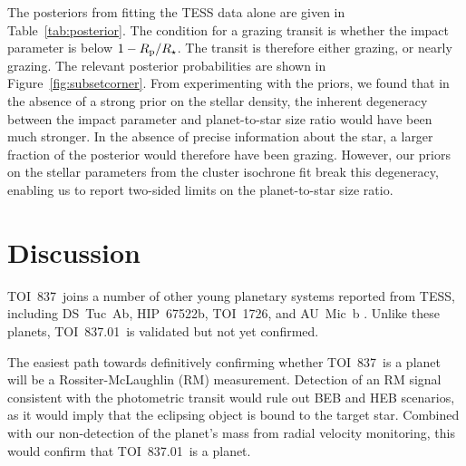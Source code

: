 \documentclass[12pt,twocolumn,tighten]{aastex63}
\newcommand{\tn}{TOI~837} %
\newcommand{\pn}{TOI~837.01} %
\begin{document}
The posteriors from fitting the TESS data alone are given in
Table~\ref{tab:posterior}.  The condition for a grazing transit is
whether the impact parameter is below $1 - R_{\rm p}/R_\star$.  The
transit is therefore either grazing, or nearly grazing.   The relevant
posterior probabilities are shown in Figure~\ref{fig:subsetcorner}.
From experimenting with the priors, we found that in the absence of a
strong prior on the stellar density, the inherent degeneracy between
the impact parameter and planet-to-star size ratio would have been
much stronger.  In the absence of precise information about the star,
a larger fraction of the posterior would therefore have been grazing.
However, our priors on the stellar parameters from the cluster
isochrone fit break this degeneracy, enabling us to report two-sided
limits on the planet-to-star size ratio.




\section{Discussion}
\label{sec:discussion}

\tn\ joins a number of other young planetary systems reported from
TESS, including DS~Tuc~Ab, HIP~67522b, TOI~1726, and AU~Mic~b
\citep{newton_tess_2019,zhou_well_2019,montet_young_2019,rizzuto_tess_2020,mann_tess_2020,plavchan_planet_2020,palle_transmission_2020,addison_youngest_2020,martioli_magnetism_2020,hirano_limits_2020}.
Unlike these planets, \pn\ is validated but not yet confirmed.

The easiest path towards definitively confirming whether \tn\ is a
planet will be a Rossiter-McLaughlin (RM) measurement.  Detection of
an RM signal consistent with the photometric transit would rule out
BEB and HEB scenarios, as it would imply that the eclipsing object is
bound to the target star. Combined with our non-detection of the
planet's mass from radial velocity monitoring, this would confirm that
\pn\ is a planet.
\end{document}
